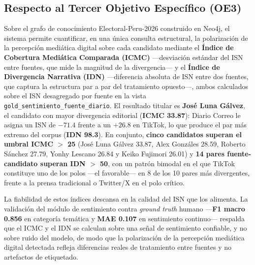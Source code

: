 \subsection*{Respecto al Tercer Objetivo Específico (OE3)}
Sobre el grafo de conocimiento Electoral-Peru-2026 construido en Neo4j, el sistema permite cuantificar, en una única consulta estructural, la polarización de la percepción mediática digital sobre cada candidato mediante el \textbf{Índice de Cobertura Mediática Comparada (ICMC)} —desviación estándar del ISN entre fuentes, que mide la magnitud de la divergencia— y el \textbf{Índice de Divergencia Narrativa (IDN)} —diferencia absoluta de ISN entre dos fuentes, que captura la estructura par a par del tratamiento opuesto—, ambos calculados sobre el ISN desagregado por fuente en la vista \texttt{gold\_sentimiento\_fuente\_diario}. El resultado titular es \textbf{José Luna Gálvez}, el candidato con mayor divergencia editorial (\textbf{ICMC 33.87}): Diario Correo le asigna un ISN de $-71.4$ frente a un $+26.8$ en TikTok, lo que produce el par más extremo del corpus (\textbf{IDN 98.3}). En conjunto, \textbf{cinco candidatos superan el umbral ICMC $>$ 25} (José Luna Gálvez 33.87, Alex Gonzáles 28.59, Roberto Sánchez 27.79, Yonhy Lescano 26.84 y Keiko Fujimori 26.01) y \textbf{14 pares fuente-candidato superan IDN $>$ 50}, con un patrón bimodal en el que TikTok constituye uno de los polos —el favorable— en 8 de los 10 pares más divergentes, frente a la prensa tradicional o Twitter/X en el polo crítico.

La fiabilidad de estos índices descansa en la calidad del ISN que los alimenta. La validación del módulo de sentimiento contra \textit{ground truth} humano —\textbf{F1 macro 0.856} en categoría temática y \textbf{MAE 0.107} en sentimiento continuo— respalda que el ICMC y el IDN se calculan sobre una señal de sentimiento confiable, y no sobre ruido del modelo, de modo que la polarización de la percepción mediática digital detectada refleja diferencias reales de tratamiento entre fuentes y no artefactos de etiquetado.

